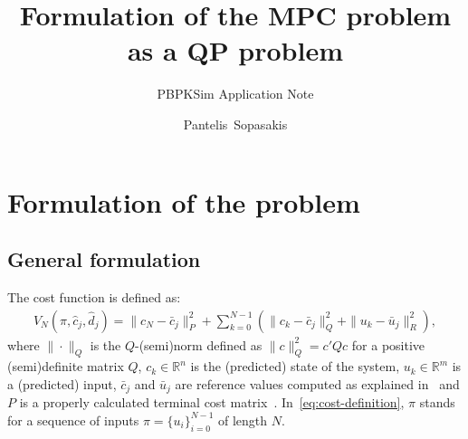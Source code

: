 \documentclass[12pt]{scrartcl}
\title{Formulation of the MPC problem as a QP problem}
\subtitle{PBPKSim Application Note}
\author{Pantelis~Sopasakis}
\renewcommand{\Re}{\mathbb{R}}
\begin{document}
\maketitle


\section*{Formulation of the problem}
\subsection*{General formulation}
The cost function is defined as:
\begin{align}\label{eq:cost-definition}
V_N(\pi, \hat{c}_j, \hat{d}_j) = \|c_N - \bar{c}_j\|_P^2 + \sum_{k=0}^{N-1}\left( 
\|c_k-\bar{c}_j\|_Q^2+\|u_k-\bar{u}_j\|_R^2
\right),
\end{align}
where $\|\cdot\|_Q$ is the $Q$-(semi)norm defined as $\|c\|_Q^2=c'Qc$ for 
a positive (semi)definite matrix $Q$, $c_k\in\Re^n$ is the (predicted) state of the system,
$u_k\in\Re^m$ is a (predicted) input, $\bar{c}_j$ and $\bar{u}_j$ are reference values
computed as explained in~\cite[Eq. (33)]{SopPatSar14} and $P$ is a 
properly calculated terminal cost matrix~\cite[Eq. (32)]{SopPatSar14}.
In~\eqref{eq:cost-definition}, $\pi$ stands for a sequence of inputs
$\pi=\{u_i\}_{i=0}^{N-1}$ of length $N$.
\end{document}
